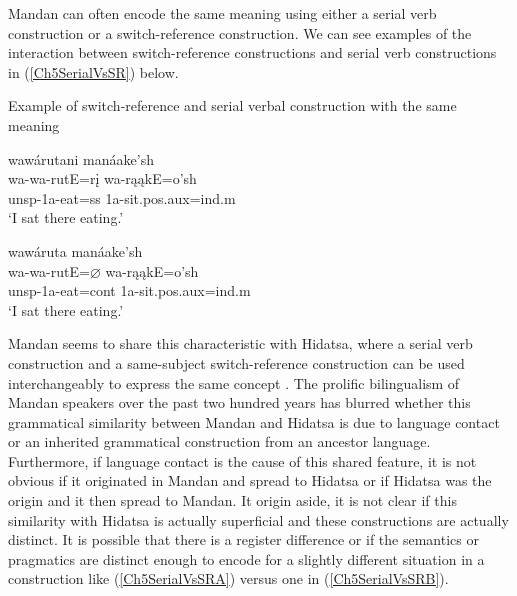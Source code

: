 Mandan can often encode the same meaning using either a serial verb construction or a switch-reference construction. We can see examples of the interaction between switch-reference constructions and serial verb constructions in (\ref{Ch5SerialVsSR}) below.

\newpage

\begin{exe}

    \item\label{Ch5SerialVsSR} Example of switch-reference and serial verbal construction with the same meaning

    \begin{xlist}
    \item\label{Ch5SerialVsSRA} \glll wawárutani manáake'sh\\
    wa-wa-rutE=rį wa-rąąkE=o'sh\\
    unsp-1a-\textnormal{eat}=ss 1a-\textnormal{sit}.pos.aux=ind.m\\
    \glt `I sat there eating.'

    \item\label{Ch5SerialVsSRB} \glll wawáruta manáake'sh\\
    wa-wa-rutE=$\varnothing$ wa-rąąkE=o'sh\\
    unsp-1a-\textnormal{eat}=cont 1a-\textnormal{sit}.pos.aux=ind.m\\
    \glt `I sat there eating.'

    \end{xlist}

\end{exe}

Mandan seems to share this characteristic with Hidatsa, where a serial verb construction and a same-subject switch-reference construction can be used interchangeably to express the same concept \citep[541]{park2012}. The prolific bilingualism of Mandan speakers over the past two hundred years has blurred whether this grammatical similarity between Mandan and Hidatsa is due to language contact or an inherited grammatical construction from an ancestor language. Furthermore, if language contact is the cause of this shared feature, it is not obvious if it originated in Mandan and spread to Hidatsa or if Hidatsa was the origin and it then spread to Mandan. It origin aside, it is not clear if this similarity with Hidatsa is actually superficial and these constructions are actually distinct. It is possible that there is a register difference or if the semantics or pragmatics are distinct enough to encode for a slightly different situation in a construction like (\ref{Ch5SerialVsSRA}) versus one in (\ref{Ch5SerialVsSRB}). 

